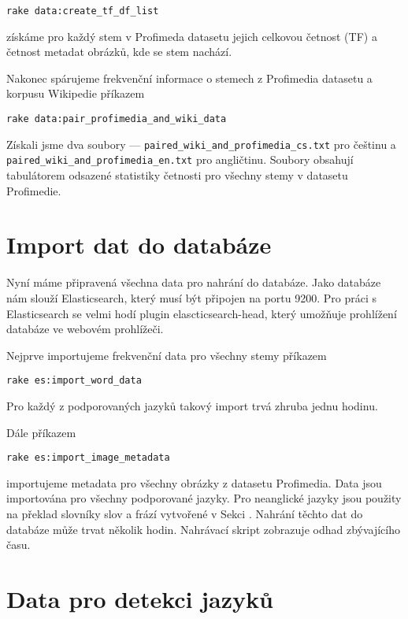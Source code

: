 \begin{lstlisting}
rake data:create_tf_df_list
\end{lstlisting}

získáme pro každý stem v Profimeda datasetu jejich celkovou četnost (TF) a četnost metadat obrázků, kde se stem nachází.

Nakonec spárujeme frekvenční informace o stemech z Profimedia datasetu a korpusu Wikipedie příkazem

\begin{lstlisting}
rake data:pair_profimedia_and_wiki_data
\end{lstlisting}

Získali jsme dva soubory --- \lstinline{paired_wiki_and_profimedia_cs.txt} pro češtinu a \lstinline{paired_wiki_and_profimedia_en.txt} pro angličtinu. Soubory obsahují tabulátorem odsazené statistiky četnosti pro všechny stemy v datasetu Profimedie.

\section{Import dat do databáze}
\label{subsec:zprovozneni_import}

Nyní máme připravená všechna data pro nahrání do databáze. Jako databáze nám slouží Elasticsearch, který musí být připojen na portu 9200. Pro práci s Elasticsearch se velmi hodí plugin elascticsearch-head, který umožňuje prohlížení databáze ve webovém prohlížeči.

Nejprve importujeme frekvenční data pro všechny stemy příkazem

\begin{lstlisting}
rake es:import_word_data
\end{lstlisting}

Pro každý z podporovaných jazyků takový import trvá zhruba jednu hodinu.

Dále příkazem

\begin{lstlisting}
rake es:import_image_metadata
\end{lstlisting}

importujeme metadata pro všechny obrázky z datasetu Profimedia. Data jsou importována pro všechny podporované jazyky. Pro neanglické jazyky jsou použity na překlad slovníky slov a frází vytvořené v Sekci \label{subsec:zprovozneni_preklad}. Nahrání těchto dat do databáze může trvat několik hodin. Nahrávací skript zobrazuje odhad zbývajícího času.

\section{Data pro detekci jazyků}
\label{subsec:zprovozneni_detekce}

